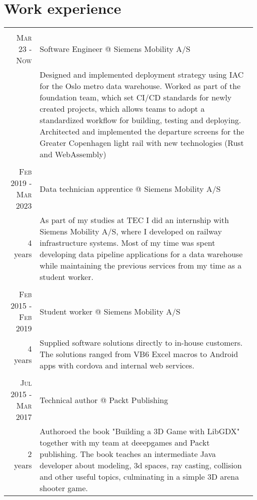 \documentclass[a4paper,10pt]{article}
\begin{document}
\section{Work experience}
\begin{tabular}{r|p{13cm}}
	\multicolumn{2}{c}{}                                                             \\
	\textsc{Mar 23 - Now}        & Software Engineer @ Siemens Mobility A/S          \\ &\footnotesize{Designed and implemented deployment strategy using IAC for the Oslo metro data warehouse. Worked as part of the foundation team, which set CI/CD standards for newly created projects, which allows teams to adopt a standardized workflow for building, testing and deploying. Architected and implemented the departure screens for the Greater Copenhagen light rail with new technologies (Rust and WebAssembly)}\\
	\multicolumn{2}{c}{}                                                             \\
	\textsc{Feb 2019 - Mar 2023} & Data technician apprentice @ Siemens Mobility A/S \\ \footnotesize{4 years} &\footnotesize{As part of my studies at TEC I did an internship with Siemens Mobility A/S, where I developed on railway infrastructure systems. Most of my time was spent developing data pipeline applications for a data warehouse while maintaining the previous services from my time as a student worker.}\\
	\multicolumn{2}{c}{}                                                             \\
	\textsc{Feb 2015 - Feb 2019} & Student worker @ Siemens Mobility A/S             \\ \footnotesize{4 years}&\footnotesize{Supplied software solutions directly to in-house customers. The solutions ranged from VB6 Excel macros to Android apps with cordova and internal web services.}\\
	\multicolumn{2}{c}{}                                                             \\
	\textsc{Jul 2015 - Mar 2017} & Technical author @ Packt Publishing               \\ \footnotesize{2 years}&\footnotesize{Authoroed the book "Building a 3D Game with LibGDX" together with my team at deeepgames and Packt publishing. The book teaches an intermediate Java developer about modeling, 3d spaces, ray casting, collision and other useful topics, culminating in a simple 3D arena shooter game.}\\

\end{tabular}
\end{document}
